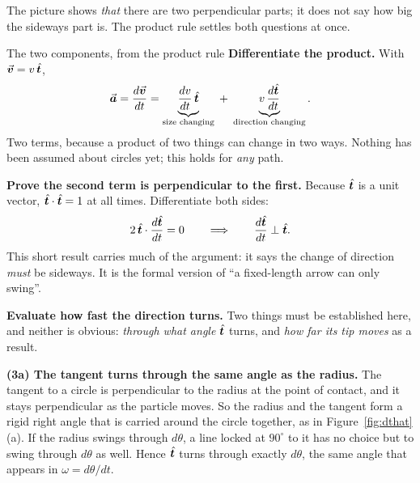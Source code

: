 \begin{figure}[htbp]
\centering
{}
\end{figure}

The picture shows \emph{that} there are two perpendicular parts; it does not say how big the sideways
part is. The product rule settles both questions at once.

\begin{derivbox}{The two components, from the product rule}
 \textbf{Differentiate the product.} With $\vec{\bm{v}}=v\,\hat{\bm{t}}$,
\[
\vec{\bm{a}}=\frac{d\vec{\bm{v}}}{dt}=\underbrace{\frac{dv}{dt}\,\hat{\bm{t}}}_{\text{size changing}}
\;+\;\underbrace{v\,\frac{d\hat{\bm{t}}}{dt}}_{\text{direction changing}}.
\]
Two terms, because a product of two things can change in two ways. Nothing has been assumed about
circles yet; this holds for \emph{any} path.

 \textbf{Prove the second term is perpendicular to the first.} Because $\hat{\bm{t}}$ is a unit
vector, $\hat{\bm{t}}\cdot\hat{\bm{t}}=1$ at all times. Differentiate both sides:
\[
2\,\hat{\bm{t}}\cdot\frac{d\hat{\bm{t}}}{dt}=0
\qquad\Longrightarrow\qquad
\frac{d\hat{\bm{t}}}{dt}\perp\hat{\bm{t}}.
\]
This short result carries much of the argument: it says the change of direction \emph{must} be
sideways. It is the formal version of ``a fixed-length arrow can only swing''.

 \textbf{Evaluate how fast the direction turns.} Two things must be established here, and
neither is obvious: \emph{through what angle} $\hat{\bm{t}}$ turns, and \emph{how far its tip moves} as a
result.

\smallskip
\textbf{(3a) The tangent turns through the same angle as the radius.} The tangent to a circle is
perpendicular to the radius at the point of contact, and it stays perpendicular as the particle moves.
So the radius and the tangent form a rigid right angle that is carried around the circle together, as
in Figure~\ref{fig:dthat}(a). If
the radius swings through $d\theta$, a line locked at $90^\circ$ to it has no choice but to swing
through $d\theta$ as well. Hence $\hat{\bm{t}}$ turns through exactly $d\theta$, the same angle that
appears in $\omega=d\theta/dt$.


\end{derivbox}
